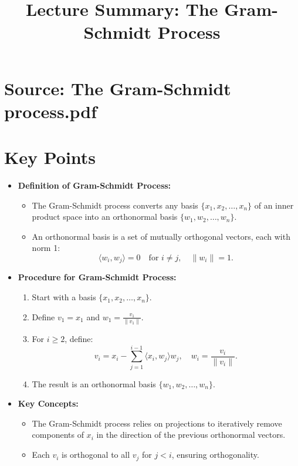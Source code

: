\documentclass{article}
\title{Lecture Summary: The Gram-Schmidt Process}
\author{}
\date{}
\begin{document}
\maketitle

\section*{Source: The Gram-Schmidt process.pdf}

\section*{Key Points}

\begin{itemize}
  \item \textbf{Definition of Gram-Schmidt Process:}
    \begin{itemize}
      \item The Gram-Schmidt process converts any basis $\{x_1, x_2, \dots, x_n\}$ of an inner product space into an orthonormal basis $\{w_1, w_2, \dots, w_n\}$.
      \item An orthonormal basis is a set of mutually orthogonal vectors, each with norm 1:
        \[
          \langle w_i, w_j \rangle = 0 \quad \text{for } i \neq j, \quad \|w_i\| = 1.
        \]
    \end{itemize}

  \item \textbf{Procedure for Gram-Schmidt Process:}
    \begin{enumerate}
      \item Start with a basis $\{x_1, x_2, \dots, x_n\}$.
      \item Define $v_1 = x_1$ and $w_1 = \frac{v_1}{\|v_1\|}$.
      \item For $i \geq 2$, define:
        \[
          v_i = x_i - \sum_{j=1}^{i-1} \langle x_i, w_j \rangle w_j, \quad w_i = \frac{v_i}{\|v_i\|}.
        \]
      \item The result is an orthonormal basis $\{w_1, w_2, \dots, w_n\}$.
    \end{enumerate}

  \item \textbf{Key Concepts:}
    \begin{itemize}
      \item The Gram-Schmidt process relies on projections to iteratively remove components of $x_i$ in the direction of the previous orthonormal vectors.
      \item Each $v_i$ is orthogonal to all $v_j$ for $j < i$, ensuring orthogonality.
    \end{itemize}


\end{itemize}
\end{document}
